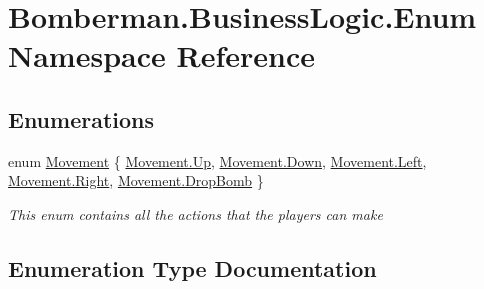 \hypertarget{namespace_bomberman_1_1_business_logic_1_1_enum}{}\section{Bomberman.\+Business\+Logic.\+Enum Namespace Reference}
\label{namespace_bomberman_1_1_business_logic_1_1_enum}
\subsection*{Enumerations}
\begin{DoxyCompactItemize}
\item 
enum \mbox{\hyperlink{namespace_bomberman_1_1_business_logic_1_1_enum_ae31d051394d251f13cbd72f883375601}{Movement}} \{ \newline
\mbox{\hyperlink{namespace_bomberman_1_1_business_logic_1_1_enum_ae31d051394d251f13cbd72f883375601a258f49887ef8d14ac268c92b02503aaa}{Movement.\+Up}}, 
\mbox{\hyperlink{namespace_bomberman_1_1_business_logic_1_1_enum_ae31d051394d251f13cbd72f883375601a08a38277b0309070706f6652eeae9a53}{Movement.\+Down}}, 
\mbox{\hyperlink{namespace_bomberman_1_1_business_logic_1_1_enum_ae31d051394d251f13cbd72f883375601a945d5e233cf7d6240f6b783b36a374ff}{Movement.\+Left}}, 
\mbox{\hyperlink{namespace_bomberman_1_1_business_logic_1_1_enum_ae31d051394d251f13cbd72f883375601a92b09c7c48c520c3c55e497875da437c}{Movement.\+Right}}, 
\newline
\mbox{\hyperlink{namespace_bomberman_1_1_business_logic_1_1_enum_ae31d051394d251f13cbd72f883375601afa0e5b670ba197d797ccb5288af299d4}{Movement.\+Drop\+Bomb}}
 \}
\begin{DoxyCompactList}\small\item\em This enum contains all the actions that the players can make \end{DoxyCompactList}\end{DoxyCompactItemize}


\subsection{Enumeration Type Documentation}
\mbox{\label{namespace_bomberman_1_1_business_logic_1_1_enum_ae31d051394d251f13cbd72f883375601}} 
